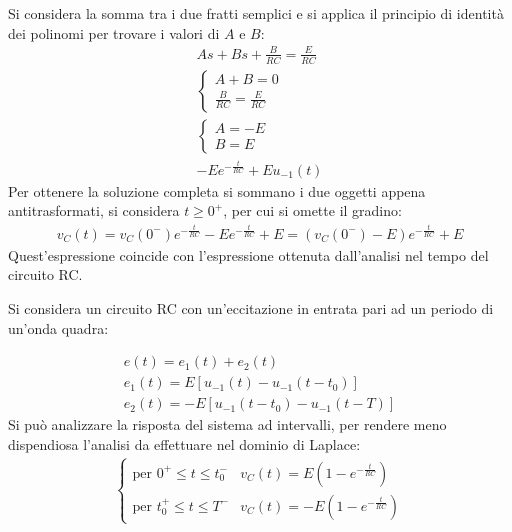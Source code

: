\documentclass{article}
\numberwithin{equation}{subsection}
\begin{document}
Si considera la somma tra i due fratti semplici e si applica il principio di identità dei polinomi per trovare i valori di $A$ e $B$:
\begin{gather*}
    As+Bs+\displaystyle\frac{B}{RC}=\frac{E}{RC}\\
    \begin{cases}
        A+B=0\\
        \displaystyle\frac{B}{RC}=\frac{E}{RC}
    \end{cases}\\
    \begin{cases}
        A=-E\\
        B=E
    \end{cases}\\
    -Ee^{-\frac{t}{RC}}+Eu_{-1}(t)
\end{gather*}
Per ottenere la soluzione completa si sommano i due oggetti appena antitrasformati, si considera $t\geq0^+$, per cui si omette il gradino:
\begin{gather*}
    v_C(t)=v_C(0^-)e^{-\frac{t}{RC}}-Ee^{-\frac{t}{RC}}+E=(v_C(0^-)-E)e^{-\frac{t}{RC}}+E
\end{gather*}
Quest'espressione coincide con l'espressione ottenuta dall'analisi nel tempo del circuito RC. 



Si considera un circuito RC con un'eccitazione in entrata pari ad un periodo di un'onda quadra:
\begin{center}
\end{center}
\begin{gather*}
    e(t)=e_1(t)+e_2(t)\\
    e_1(t)=E[u_{-1}(t)-u_{-1}(t-t_0)]\\
    e_2(t)=-E[u_{-1}(t-t_0)-u_{-1}(t-T)]
\end{gather*}
Si può analizzare la risposta del sistema ad intervalli, per rendere meno dispendiosa l'analisi da effettuare nel dominio di Laplace:
\begin{gather*}
    \begin{cases}
        \mbox{per }0^+\leq t\leq t_0^-& v_C(t)=E\left(1-e^{-\frac{t}{RC}}\right)\\
        \mbox{per }t_0^+\leq t\leq T^-& v_C(t)=-E\left(1-e^{-\frac{t}{RC}}\right)
    \end{cases}
\end{gather*}
\end{document}
